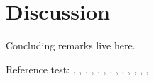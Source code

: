 \section{Discussion}
\label{sec:discussion}

Concluding remarks live here.

Reference test:
\cite{ArcherWest2003},
\cite{BarrettJolleyetal2010},
\cite{Chaetal2009},
\cite{Chuetal2006},
\cite{Clarketal2011},
\cite{Halletal1996},
\cite{Horriganetal2002},
\cite{Lewisetal2011},
\cite{Maleckaretal2009},
\cite{Nygrenetal1998},
\cite{RadhakrishnanHindmarsh1993},
\cite{Tsugaetal2001},
\cite{UNKNOWN},

